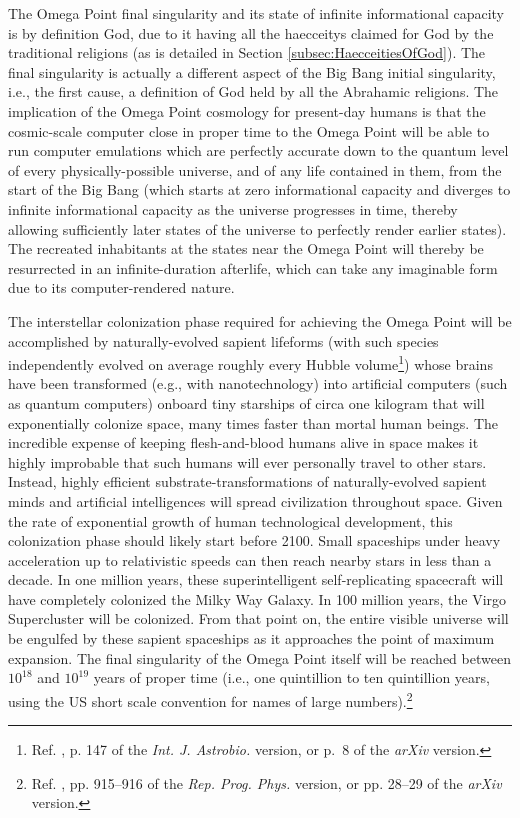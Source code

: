\documentclass[letterpaper,12pt]{article}
\begin{document}
The Omega Point final singularity and its state of infinite informational capacity is by definition God, due to it having all the \glspl{haecceity} claimed for God by the traditional religions (as is detailed in Section \ref{subsec:HaecceitiesOfGod}). The final singularity is actually a different aspect of the Big Bang initial singularity, i.e., the first cause, a definition of God held by all the Abrahamic religions. The implication of the Omega Point cosmology for present-day humans is that the cosmic-scale computer close in proper time to the Omega Point will be able to run computer emulations which are perfectly accurate down to the quantum level of every physically-possible universe, and of any life contained in them, from the start of the Big Bang (which starts at zero informational capacity and diverges to infinite informational capacity as the universe progresses in time, thereby allowing sufficiently later states of the universe to perfectly render earlier states). The recreated inhabitants at the states near the Omega Point will thereby be resurrected in an infinite-duration afterlife, which can take any imaginable form due to its computer-rendered nature.

The interstellar colonization phase required for achieving the Omega Point will be accomplished by naturally-evolved sapient lifeforms (with such species independently evolved on average roughly every Hubble volume\footnote{Ref. , p. 147 of the \emph{Int. J. Astrobio.} version, or p.~8 of the \emph{arXiv} version.}) whose brains have been transformed (e.g., with nanotechnology) into artificial computers (such as quantum computers) onboard tiny starships of circa one kilogram that will exponentially colonize space, many times faster than mortal human beings. The incredible expense of keeping flesh-and-blood humans alive in space makes it highly improbable that such humans will ever personally travel to other stars. Instead, highly efficient substrate-transformations of naturally-evolved sapient minds and artificial intelligences will spread civilization throughout space. Given the rate of exponential growth of human technological development, this colonization phase should likely start before 2100. Small spaceships under heavy acceleration up to relativistic speeds can then reach nearby stars in less than a decade. In one million years, these superintelligent self-replicating spacecraft will have completely colonized the Milky Way Galaxy. In 100 million years, the Virgo Supercluster will be colonized. From that point on, the entire visible universe will be engulfed by these sapient spaceships as it approaches the point of maximum expansion. The final singularity of the Omega Point itself will be reached between \( 10^{18} \) and \( 10^{19} \) years of proper time (i.e., one quintillion to ten quintillion years, using the US short scale convention for names of large numbers).\footnote{Ref. , pp. 915--916 of the \emph{Rep. Prog. Phys.} version, or pp. 28--29 of the \emph{arXiv} version.}
\end{document}
